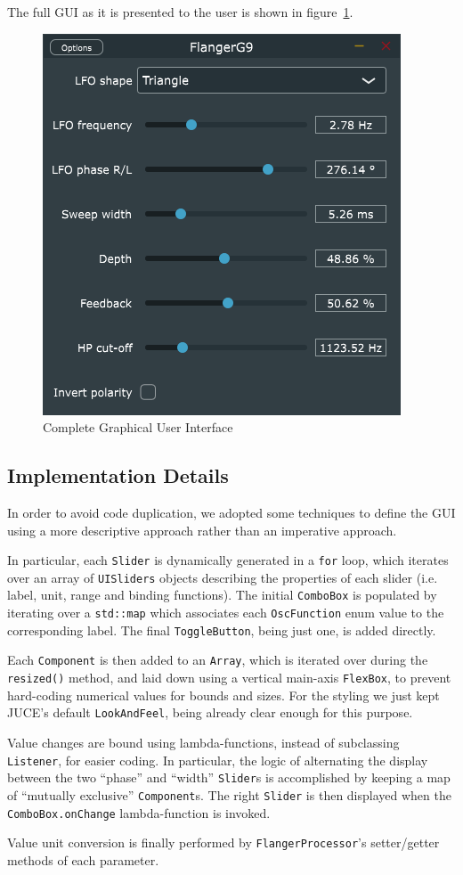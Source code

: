 The full GUI as it is presented to the user is shown in figure~\ref{fig:gui-all}.

\begin{figure}
	\centering
	\includegraphics[width=0.5\linewidth]{assets/gui-all.png}
	\caption{Complete Graphical User Interface}
	\label{fig:gui-all}
\end{figure}

\subsection{Implementation Details}

In order to avoid code duplication, we adopted some techniques to define the GUI using a more descriptive approach rather than an imperative approach.

In particular, each \texttt{Slider} is dynamically generated in a \texttt{for} loop, which iterates over an array of \texttt{UISliders} objects describing the properties of each slider (i.e. label, unit, range and binding functions).
The initial \texttt{ComboBox} is populated by iterating over a \texttt{std::map} which associates each \texttt{OscFunction} enum value to the corresponding label. The final \texttt{ToggleButton}, being just one, is added directly.

Each \texttt{Component} is then added to an \texttt{Array}, which is iterated over during the \texttt{resized()} method, and laid down using a vertical main-axis \texttt{FlexBox}, to prevent hard-coding numerical values for bounds and sizes. For the styling we just kept JUCE's default \texttt{LookAndFeel}, being already clear enough for this purpose.

Value changes are bound using lambda-functions, instead of subclassing \texttt{Listener}, for easier coding.
In particular, the logic of alternating the display between the two ``phase'' and ``width'' \texttt{Slider}s is accomplished by keeping a map of ``mutually exclusive'' \texttt{Component}s. The right \texttt{Slider} is then displayed when the \texttt{ComboBox.onChange} lambda-function is invoked.

Value unit conversion is finally performed by \texttt{FlangerProcessor}'s setter/getter methods of each parameter.